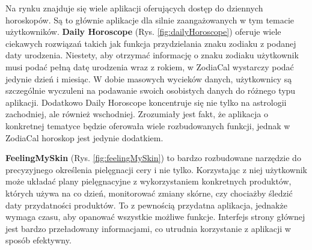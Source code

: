 Na rynku znajduje się wiele aplikacji oferujących dostęp do dziennych horoskopów. Są to głównie aplikacje dla silnie zaangażowanych w tym temacie użytkowników. \textbf{Daily Horoscope} (Rys. \ref{fig:dailyHoroscope}) oferuje wiele ciekawych rozwiązań takich jak funkcja przydzielania znaku zodiaku z podanej daty urodzenia. Niestety, aby otrzymać informację o znaku zodiaku użytkownik musi podać pełną datę urodzenia wraz z rokiem, w ZodiaCal wystarczy podać jedynie dzień i miesiąc. W dobie masowych wycieków danych, użytkownicy są szczególnie wyczuleni na podawanie swoich osobistych danych do różnego typu aplikacji. Dodatkowo Daily Horoscope koncentruje się nie tylko na astrologii zachodniej, ale również wschodniej. Zrozumiały jest fakt, że aplikacja o konkretnej tematyce będzie oferowała wiele rozbudowanych funkcji, jednak w ZodiaCal horoskop jest jedynie dodatkiem.


\textbf{FeelingMySkin} (Rys. \ref{fig:feelingMySkin}) to bardzo rozbudowane narzędzie do precyzyjnego określenia pielęgnacji cery i nie tylko.
Korzystając z niej użytkownik może układać plany pielęgnacyjne z wykorzystaniem konkretnych produktów,
których używa na co dzień, monitorować zmiany skórne, czy chociażby śledzić daty przydatności produktów.
To z pewnością przydatna aplikacja, jednakże wymaga czasu, aby opanować wszystkie możliwe funkcje.
Interfejs strony głównej jest bardzo przeładowany informacjami, co utrudnia korzystanie z aplikacji w sposób efektywny.

